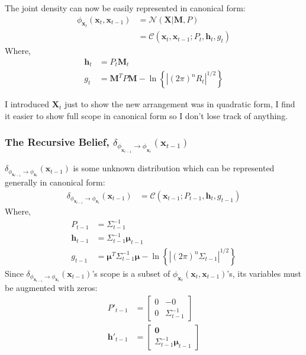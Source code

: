 The joint density can now be easily represented in canonical form:
\begin{align}
\phi_{\pmb{x}_t} (\pmb{x}_{t}, \pmb{x}_{t-1}) &= \mathcal{N}\left( \pmb{X} | \pmb{M}, P \right) \nonumber \\
&= \mathcal{C} \left( \pmb{x}_t, \pmb{x}_{t-1} ; P_t, \pmb{h}_{t}, g_{t} \right)
\end{align}
Where, 
\begin{align}
\pmb{h}_{t} &= P_{t} \pmb{M}_{t} \\
g_{t} &= \pmb{M}^{T} P \pmb{M} - \ln{ \left\{ | (2 \pi)^{n} R_{t} |^{1/2} \right\} }
\end{align}
\begin{remark}
I introduced $\pmb{X}_{t}$ just to show the new arrangement was in quadratic form, I find it easier to show full scope in canonical form  so I don't lose track of anything.
\end{remark}

\subsubsection{The Recursive Belief, $\delta_{\phi_{\pmb{x}_{t-1}} \rightarrow \phi_{\pmb{x}_{t}}} (\pmb{x}_{t-1})$}
\label{subsubsection:rec_bel}

$\delta_{\phi_{\pmb{x}_{t-1}} \rightarrow \phi_{\pmb{x}_{t}}} (\pmb{x}_{t-1})$ is some unknown distribution which can be represented generally in canonical form:
\begin{align}
\delta_{\phi_{\pmb{x}_{t-1}} \rightarrow \phi_{\pmb{x}_{t}}} (\pmb{x}_{t-1}) &= \mathcal{C}\left( \pmb{x}_{t-1}; P_{t-1}, \pmb{h}_{t}, g_{t-1} \right) 
\end{align}
Where, 
\begin{align}
P_{t-1} &= \Sigma^{-1}_{t-1} \\
\mathbf{h}_{t-1} &= \Sigma_{t-1}^{-1} \pmb{\mu}_{t-1} \\
g_{t-1} &= \pmb{\mu}^{T} \Sigma_{t-1}^{-1} \pmb{\mu} - \ln{ \left\{ | (2 \pi)^{n} \Sigma_{t-1} |^{1/2} \right\} }
\end{align}
Since $\delta_{\phi_{\pmb{x}_{t-1}} \rightarrow \phi_{\pmb{x}_{t}}} (\pmb{x}_{t-1})$'s scope is a subset of $\phi_{\pmb{x}_t} (\pmb{x}_{t}, \pmb{x}_{t-1})$'s, its variables must be augmented with zeros:
\begin{align}
P'_{t-1} &= \begin{bmatrix} 0 & -0 \\ 0 &  \Sigma^{-1}_{t-1} \end{bmatrix}\\
\mathbf{h}'_{t-1} &= \begin{bmatrix} \pmb{0} \\ \Sigma_{t-1}^{-1} \pmb{\mu}_{t-1} \end{bmatrix} 
\end{align}

